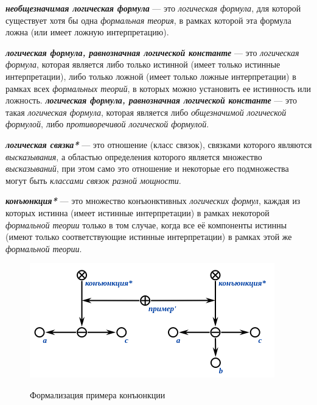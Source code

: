 \textbf{\textit{необщезначимая логическая формула}} --- это \textit{логическая формула}, для которой существует хотя бы одна \textit{формальная теория}, в рамках которой эта формула ложна (или имеет ложную интерпретацию).

\textbf{\textit{логическая формула, равнозначная логической константе}} --- это \textit{логическая формула}, которая является либо только истинной (имеет только истинные интерпретации), либо только ложной (имеет только ложные интерпретации) в рамках всех \textit{формальных теорий}, в которых можно установить ее истинность или ложность.
\textbf{\textit{логическая формула, равнозначная логической константе}} --- это такая \textit{логическая формула}, которая является либо \textit{общезначимой логической формулой}, либо \textit{противоречивой логической формулой}.

\begin{SCn}
\end{SCn}

\textbf{\textit{логическая связка*}} --- это отношение (класс связок), связками которого являются \textit{высказывания}, а областью определения которого является множество \textit{высказываний}, при этом само это отношение и некоторые его подмножества могут быть \textit{классами связок разной мощности}.

\begin{SCn}
\end{SCn}

\textbf{\textit{конъюнкция*}} --- это множество конъюнктивных \textit{логических формул}, каждая из которых истинна (имеет истинные интерпретации) в рамках некоторой \textit{формальной теории} только в том случае, когда все её компоненты истинны (имеют только соответствующие истинные интерпретации) в рамках этой же \textit{формальной теории}. 

\begin{figure}[H]
	\caption{Формализация примера конъюнкции}
	\includegraphics[scale=0.8]{author/part2/figures/logic/conjunction.png}
	\label{fig:conjunction}
\end{figure}

